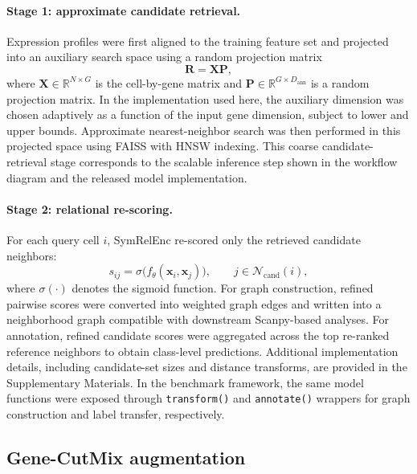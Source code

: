 \documentclass[11pt]{article}
\begin{document}
\paragraph{Stage 1: approximate candidate retrieval.}
Expression profiles were first aligned to the training feature set and projected into an auxiliary search space using a random projection matrix
\begin{equation}
\mathbf{R} = \mathbf{X}\mathbf{P},
\label{eq:random_projection}
\end{equation}
where $\mathbf{X} \in \mathbb{R}^{N \times G}$ is the cell-by-gene matrix and $\mathbf{P} \in \mathbb{R}^{G \times D_{\mathrm{ann}}}$ is a random projection matrix\cite{Johnson1984JL,Dasgupta2003JL}. In the implementation used here, the auxiliary dimension was chosen adaptively as a function of the input gene dimension, subject to lower and upper bounds. Approximate nearest-neighbor search was then performed in this projected space using FAISS with HNSW indexing\cite{Johnson2017Faiss,Malkov2020HNSW}. This coarse candidate-retrieval stage corresponds to the scalable inference step shown in the workflow diagram and the released model implementation. 

\paragraph{Stage 2: relational re-scoring.}
For each query cell $i$, SymRelEnc re-scored only the retrieved candidate neighbors:
\begin{equation}
s_{ij} = \sigma\!\bigl(f_{\theta}(\mathbf{x}_i,\mathbf{x}_j)\bigr),
\qquad
j \in \mathcal{N}_{\mathrm{cand}}(i),
\label{eq:rescore}
\end{equation}
where $\sigma(\cdot)$ denotes the sigmoid function. For graph construction, refined pairwise scores were converted into weighted graph edges and written into a neighborhood graph compatible with downstream Scanpy-based analyses. For annotation, refined candidate scores were aggregated across the top re-ranked reference neighbors to obtain class-level predictions. Additional implementation details, including candidate-set sizes and distance transforms, are provided in the Supplementary Materials. In the benchmark framework, the same model functions were exposed through \texttt{transform()} and \texttt{annotate()} wrappers for graph construction and label transfer, respectively. 

\subsection{Gene-CutMix augmentation}
\end{document}

